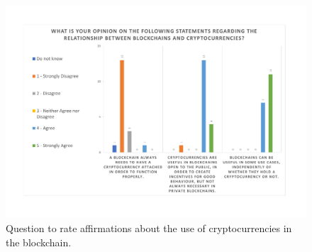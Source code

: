 \begin{figure}[h]
\centering
\includegraphics[scale=0.40]{media/survey_group2/blockchain_crypto_opinions.pdf}
\caption{Question to rate affirmations about the use of cryptocurrencies in the blockchain.}
\label{fig:blockchain_crypto_opinions}
\end{figure}



